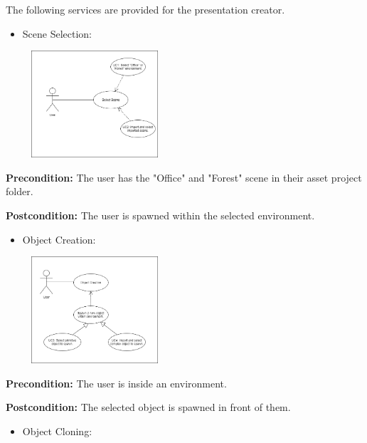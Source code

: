 \documentclass{article}
\begin{document}
	\begin{flushleft}
	The following services are provided for the presentation creator.

	\begin{itemize}
		\item Scene Selection:
	\end{itemize}


	\begin{center}
	\includegraphics[width=250px,height=150px]{SceneSelection.png}
	\end{center}

	\textbf{Precondition:} The user has the "Office" and "Forest" scene in their asset project folder.

	\textbf{Postcondition:} The user is spawned within the selected environment.

	\newpage

	\begin{itemize}
		\item Object Creation:
	\end{itemize}


	\begin{center}
	\includegraphics[width=250px,height=150px]{ObjectCreation.png}
	\end{center}

	\textbf{Precondition:} The user is inside an environment.

	\textbf{Postcondition:} The selected object is spawned in front of them.

	\begin{itemize}
		\item Object Cloning:
	\end{itemize}


\end{flushleft}
\end{document}
